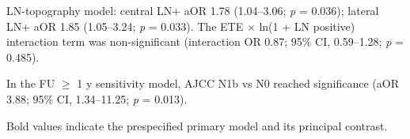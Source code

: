 \begin{landscape}
\begin{table}[htbp]
\begin{threeparttable}
\begin{tablenotes}
\item[\textsuperscript{b}] LN-topography model: central LN+ aOR 1.78 (1.04--3.06; \textit{p} = 0.036); lateral LN+ aOR 1.85 (1.05--3.24; \textit{p} = 0.033). The ETE $\times$ ln(1 + LN positive) interaction term was non-significant (interaction OR 0.87; 95\% CI, 0.59--1.28; \textit{p} = 0.485).
\item[\textsuperscript{c}] In the FU $\geq$ 1 y sensitivity model, AJCC N1b vs N0 reached significance (aOR 3.88; 95\% CI, 1.34--11.25; \textit{p} = 0.013).
\item Bold values indicate the prespecified primary model and its principal contrast.
\end{tablenotes}
\end{threeparttable}
\end{table}
\end{landscape}


